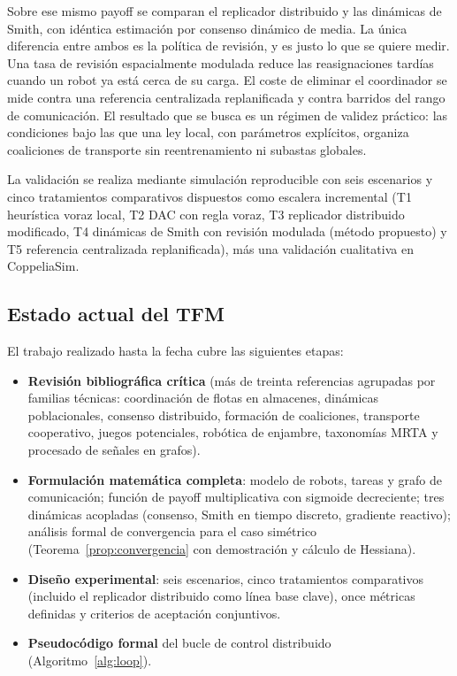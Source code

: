 Sobre ese mismo payoff se comparan el replicador distribuido y las dinámicas de
Smith, con idéntica estimación por consenso dinámico de media. La única diferencia entre
ambos es la política de revisión, y es justo lo que se quiere medir. Una tasa de revisión
espacialmente modulada reduce las reasignaciones tardías cuando un robot ya está cerca de
su carga. El coste de eliminar el coordinador se mide contra una referencia centralizada
replanificada y contra barridos del rango de comunicación. El resultado que se busca es
un régimen de validez práctico: las condiciones bajo las que una ley local, con parámetros explícitos,
organiza coaliciones de transporte sin reentrenamiento ni subastas globales.

La validación se realiza mediante simulación reproducible con seis
escenarios y cinco tratamientos comparativos dispuestos como escalera incremental
(T1 heurística voraz local, T2 DAC con regla voraz, T3 replicador distribuido
modificado, T4 dinámicas de Smith con revisión modulada (método propuesto) y
T5 referencia centralizada replanificada), más una validación cualitativa en CoppeliaSim.

\subsection{Estado actual del TFM}
\label{subsec:estado}

El trabajo realizado hasta la fecha cubre las siguientes etapas:

\begin{itemize}
  \item \textbf{Revisión bibliográfica crítica} (más de treinta referencias agrupadas
    por familias técnicas:
    coordinación de flotas en almacenes, dinámicas poblacionales, consenso
    distribuido, formación de coaliciones, transporte cooperativo, juegos
    potenciales, robótica de enjambre, taxonomías MRTA y procesado de señales en grafos).
  \item \textbf{Formulación matemática completa}: modelo de robots, tareas y
    grafo de comunicación; función de payoff multiplicativa con sigmoide
    decreciente; tres dinámicas acopladas (consenso, Smith en tiempo discreto,
    gradiente reactivo); análisis formal de convergencia para el caso simétrico
    (Teorema~\ref{prop:convergencia} con demostración y cálculo de Hessiana).
  \item \textbf{Diseño experimental}: seis escenarios, cinco tratamientos
    comparativos (incluido el replicador distribuido como línea base clave),
    once métricas definidas y criterios de aceptación conjuntivos.
  \item \textbf{Pseudocódigo formal} del bucle de control distribuido
    (Algoritmo~\ref{alg:loop}).
\end{itemize}

